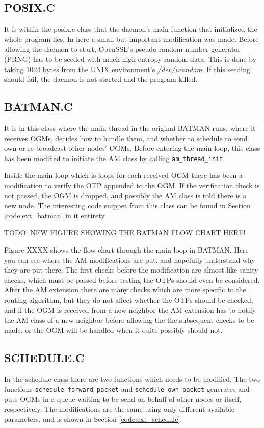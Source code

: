 \subsection{POSIX.C}\label{subsect:posix.c}
It is within the posix.c class that the daemon's main function that initialized
the whole program lies. In here a small but important modification was made.
Before allowing the daemon to start, OpenSSL's pseudo random number generator
(PRNG) has to be seeded with much high entropy random data. This is done by
taking 1024 bytes from the UNIX environment's \emph{/dev/urandom}. If this
seeding should fail, the daemon is not started and the program killed.

\subsection{BATMAN.C}\label{subsect:batman.c}
It is in this class where the main thread in the original BATMAN runs, where it
receives \acp{OGM}, decides how to handle them, and whether to schedule to send
own or re-broadcast other nodes' \acp{OGM}. Before entering the main loop, this
class has been modified to initiate the AM class by calling
\texttt{am\_thread\_init}.

Inside the main loop which is loops for each received \ac{OGM} there has been a
modification to verify the \ac{OTP} appended to the \ac{OGM}. If the
verification check is not passed, the \ac{OGM} is dropped, and possibly the AM
class is told there is a new node. The interesting code snippet from this class
can be found in Section \ref{code:ext_batman} in it entirety.

TODO: NEW FIGURE SHOWING THE BATMAN FLOW CHART HERE!

Figure XXXX shows the flow chart through the main loop in BATMAN. Here you can
see where the AM modifications are put, and hopefully understand why they are
put there. The first checks before the modification are almost like sanity
checks, which must be passed before testing the \acp{OTP} should even be
considered. After the AM extension there are many checks which are more specific
to the routing algorithm, but they do not affect whether the \acp{OTP} should be
checked, and if the OGM is received from a new neighbor the AM extension has to
notify the AM class of a new neighbor before allowing the the subsequent checks
to be made, or the OGM will be handled when it quite possibly should not.

\subsection{SCHEDULE.C}\label{subsect:schedule.c}
In the schedule class there are two functions which needs to be modified. The
two functions \texttt{schedule\_forward\_packet} and
\texttt{schedule\_own\_packet} generates and puts \acp{OGM} in a queue waiting
to be send on behalf of other nodes or itself, respectively. The modifications
are the same using only different available parameters, and is shown in Section
\ref{code:ext_schedule}.

